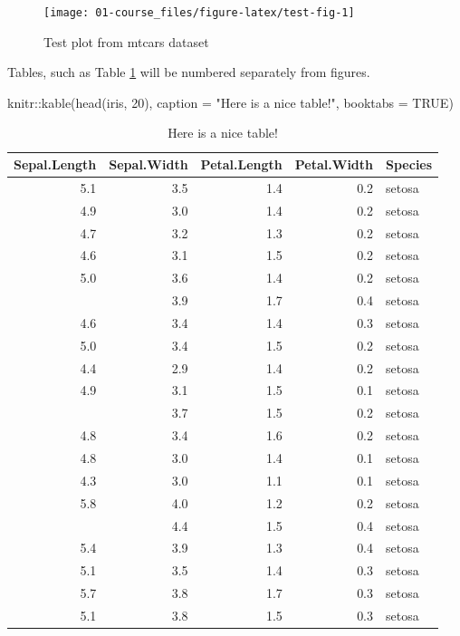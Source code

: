 \documentclass[
]{article}
\newenvironment{Shaded}{\begin{snugshade}}{\end{snugshade}}
\newcommand{\AttributeTok}[1]{\textcolor[rgb]{0.77,0.63,0.00}{#1}}
\newcommand{\ConstantTok}[1]{\textcolor[rgb]{0.00,0.00,0.00}{#1}}
\newcommand{\DecValTok}[1]{\textcolor[rgb]{0.00,0.00,0.81}{#1}}
\newcommand{\FunctionTok}[1]{\textcolor[rgb]{0.00,0.00,0.00}{#1}}
\newcommand{\NormalTok}[1]{#1}
\newcommand{\SpecialCharTok}[1]{\textcolor[rgb]{0.00,0.00,0.00}{#1}}
\newcommand{\StringTok}[1]{\textcolor[rgb]{0.31,0.60,0.02}{#1}}
\begin{document}
\begin{figure}

{\centering \texttt{[image: 01-course\_files/figure-latex/test-fig-1]} 

}

\caption{Test plot from mtcars dataset}\label{fig:test-fig}
\end{figure}

Tables, such as Table \ref{tab:test-tab} will be numbered separately from figures.

\begin{Shaded}
\begin{Highlighting}[]
\NormalTok{knitr}\SpecialCharTok{::}\FunctionTok{kable}\NormalTok{(}\FunctionTok{head}\NormalTok{(iris, }\DecValTok{20}\NormalTok{), }\AttributeTok{caption =} \StringTok{"Here is a nice table!"}\NormalTok{, }\AttributeTok{booktabs =} \ConstantTok{TRUE}\NormalTok{)}
\end{Highlighting}
\end{Shaded}

\begin{table}

\caption{\label{tab:test-tab}Here is a nice table!}
\centering
\begin{tabular}[t]{rrrrl}
\toprule
Sepal.Length & Sepal.Width & Petal.Length & Petal.Width & Species\\
\midrule
5.1 & 3.5 & 1.4 & 0.2 & setosa\\
4.9 & 3.0 & 1.4 & 0.2 & setosa\\
4.7 & 3.2 & 1.3 & 0.2 & setosa\\
4.6 & 3.1 & 1.5 & 0.2 & setosa\\
5.0 & 3.6 & 1.4 & 0.2 & setosa\\
\addlinespace
5.4 & 3.9 & 1.7 & 0.4 & setosa\\
4.6 & 3.4 & 1.4 & 0.3 & setosa\\
5.0 & 3.4 & 1.5 & 0.2 & setosa\\
4.4 & 2.9 & 1.4 & 0.2 & setosa\\
4.9 & 3.1 & 1.5 & 0.1 & setosa\\
\addlinespace
5.4 & 3.7 & 1.5 & 0.2 & setosa\\
4.8 & 3.4 & 1.6 & 0.2 & setosa\\
4.8 & 3.0 & 1.4 & 0.1 & setosa\\
4.3 & 3.0 & 1.1 & 0.1 & setosa\\
5.8 & 4.0 & 1.2 & 0.2 & setosa\\
\addlinespace
5.7 & 4.4 & 1.5 & 0.4 & setosa\\
5.4 & 3.9 & 1.3 & 0.4 & setosa\\
5.1 & 3.5 & 1.4 & 0.3 & setosa\\
5.7 & 3.8 & 1.7 & 0.3 & setosa\\
5.1 & 3.8 & 1.5 & 0.3 & setosa\\
\bottomrule
\end{tabular}
\end{table}
\end{document}
